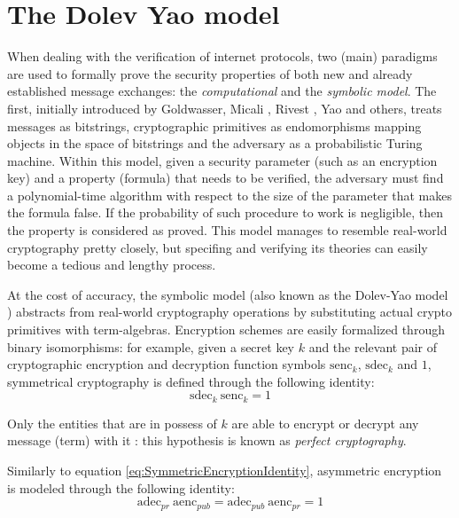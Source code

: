 \documentclass{article}
\begin{document}
\section{The Dolev Yao model}\label{sec:SymbolicModel}

When dealing with the verification of internet protocols, two (main) paradigms are used to formally prove the security properties of both new and already established message exchanges: the \textit{computational} and the \textit{symbolic model}. The first, initially introduced by Goldwasser, Micali \cite{goldwasser}, Rivest \cite{rivest}, Yao \cite{yao} and others, treats messages as bitstrings, cryptographic primitives as endomorphisms mapping objects in the space of bitstrings and the adversary as a probabilistic Turing machine. Within this model, given a security parameter (such as an encryption key) and a property (formula) that needs to be verified, the adversary must find a polynomial-time algorithm with respect to the size of the parameter that makes the formula false. If the probability of such procedure to work is negligible, then the property is considered as proved. This model manages to resemble real-world cryptography pretty closely, but specifing and verifying its theories can easily become a tedious and lengthy process.

At the cost of accuracy, the symbolic model (also known as the Dolev-Yao model \cite{DolevYao}) abstracts from real-world cryptography operations by substituting actual crypto primitives with term-algebras. Encryption schemes are easily formalized through binary isomorphisms: for example, given a secret key $k$ and the relevant pair of cryptographic encryption and decryption function symbols $\textrm{senc}_k$, $\textrm{sdec}_k$ and $1$, symmetrical cryptography is defined through the following identity:
\begin{equation}\label{eq:SymmetricEncryptionIdentity}
    \textrm{sdec}_k\ \textrm{senc}_k = 1
\end{equation}

Only the entities that are in possess of $k$ are able to encrypt or decrypt any message (term) with it \cite{BBSecurityProtocolVerification}: this hypothesis is known as \textit{perfect cryptography}.

Similarly to equation \ref{eq:SymmetricEncryptionIdentity}, asymmetric encryption is modeled through the following identity:
\begin{equation}\label{eq:AsymmetricEncryptionIdentity}
    \textrm{adec}_{pr}\ \textrm{aenc}_{pub} = \textrm{adec}_{pub}\ \textrm{aenc}_{pr} = 1
\end{equation}
\end{document}
